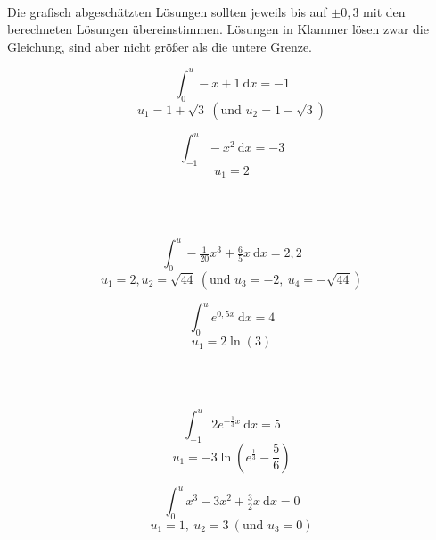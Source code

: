 \documentclass[a4paper,12pt, headsepline, ngerman]{scrartcl}
\theoremstyle{definition}
\newcommand{\td}{\ \text{d}}
\newcommand{\fakesubsection}[1]{%
	\par\refstepcounter{subsection}%
	\subsectionmark{#1}%
	\addcontentsline{toc}{subsection}{\protect\numberline{\thesubsection}#1}%
}
\begin{document}
\begin{Answer}[ref=intGrenzeA1]\\
	Die grafisch abgeschätzten Lösungen sollten jeweils bis auf \(\pm0,3\) mit den berechneten Lösungen übereinstimmen. Lösungen in Klammer lösen zwar die Gleichung, sind aber nicht größer als die untere Grenze.\\
\begin{minipage}{\textwidth}
	\begin{minipage}{.5\textwidth}\raggedright
		\[\int_0^u-x+1 \td x=-1\]
		\[u_1=1+\sqrt{3}\ \left(\text{und }u_2=1-\sqrt{3}\right)\] 
	\end{minipage}
	\begin{minipage}{.5\textwidth}
		\[\int_{-1}^u-x^2 \td x=-3\]
		\[u_1=2\]
	\end{minipage}\vspace{\baselineskip}\\\vspace{\baselineskip}\\
	\begin{minipage}{.5\textwidth}\raggedright
		\[\int_0^u-\tfrac{1}{20}x^3+\tfrac{6}{5}x \td x=2,2\]
		\[u_1=2, u_2=\sqrt{44}\ \left(\text{und }u_3=-2,\ u_4=-\sqrt{44}\right)\]
	\end{minipage}
	\begin{minipage}{.5\textwidth}
		\[\int_0^u e^{0,5x} \td x=4\]
		\[u_1=2\ln(3)\]
	\end{minipage}\vspace{\baselineskip}\\\vspace{\baselineskip}\\
	\begin{minipage}{.5\textwidth}\raggedright
		\[\int_{-1}^u 2e^{-\tfrac{1}{3}x} \td x=5\]
		\[u_1=-3\ln\left(e^{\tfrac{1}{3}}-\frac{5}{6}\right)\]
	\end{minipage}
	\begin{minipage}{.5\textwidth}
		\[\int_0^u x^3-3x^2+\tfrac{3}{2}x \td x=0\]
		\[u_1=1,\ u_2=3\ \left(\text{und }u_3=0\right)\] 
	\end{minipage}
\end{minipage}
\end{Answer}

\end{document}
